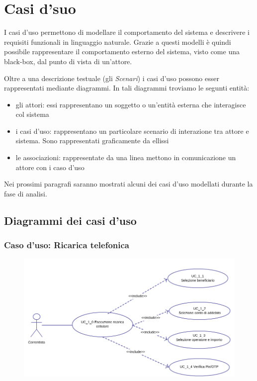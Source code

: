 \chapter{Casi d'suo}
I casi d'uso permettono di modellare il comportamento del sistema e descrivere i requisiti funzionali in linguaggio naturale. Grazie a questi modelli è quindi possibile rappresentare il comportamento esterno del sistema, visto come una black-box, dal punto di vista di un'attore.

Oltre a una descrizione testuale (gli \emph{Scenari}) i casi d'uso possono esser rappresentati mediante diagrammi. In tali diagrammi troviamo le segunti entità:
 \begin{itemize}
  \item gli attori: essi rappresentano un soggetto o un'entità esterna che interagisce col sistema
  \item i casi d'uso: rappresentano un particolare scenario di interazione tra attore e sistema. Sono rappresentati graficamente da ellissi
  \item le associazioni: rappresentate da una linea mettono in comunicazione un attore con i caso d'uso
 \end{itemize}

 Nei prossimi paragrafi saranno mostrati alcuni dei casi d'uso modellati durante la fase di analisi.
 \newpage
 
 \section{Diagrammi dei casi d'uso}
 
 \subsection{Caso d'uso: Ricarica telefonica}
	\begin{figure}[!htbp]
	  \centering
	  \includegraphics[scale=0.65]{casi_uso/ricarica.png}
	\end{figure}
	
